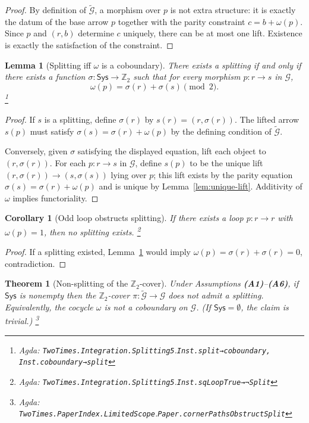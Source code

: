 \documentclass{article}
\newcommand{\Sys}{\mathsf{Sys}}
\newcommand{\Ztwo}{\mathbb{Z}_2}
\newcommand{\Agda}[1]{\texttt{#1}}
\newcommand{\AgdaRef}[2]{\emph{Agda: }\Agda{#1}.\Agda{#2}}
\newcommand{\AgdaNote}[2]{\footnote{\AgdaRef{#1}{#2}}}
\theoremstyle{definition}
\theoremstyle{plain}
\newtheorem{lemma}{Lemma}[section]
\newtheorem{theorem}{Theorem}[section]
\newtheorem{corollary}{Corollary}[section]
\begin{document}
\begin{proof}
By definition of $\widetilde{\mathcal G}$, a morphism over $p$ is not extra
structure: it is exactly the datum of the base arrow $p$ together with the
parity constraint $c=b+\omega(p)$. Since $p$ and $(r,b)$ determine $c$ uniquely,
there can be at most one lift. Existence is exactly the satisfaction of the
constraint.
\end{proof}

\begin{lemma}[Splitting iff $\omega$ is a coboundary]
\label{lem:split-cob}
There exists a splitting if and only if there exists a function
$\sigma:\Sys\to\Ztwo$ such that for every morphism $p:r\to s$ in $\mathcal G$,
\[\omega(p)=\sigma(r)+\sigma(s)\pmod 2.\]
\AgdaNote{TwoTimes.Integration.Splitting5}{Inst.split→coboundary, Inst.coboundary→split}
\end{lemma}

\begin{proof}
If $s$ is a splitting, define $\sigma(r)$ by $s(r)=(r,\sigma(r))$. The lifted arrow
$s(p)$ must satisfy $\sigma(s)=\sigma(r)+\omega(p)$ by the defining condition of
$\widetilde{\mathcal G}$.

Conversely, given $\sigma$ satisfying the displayed equation, lift each object to
$(r,\sigma(r))$. For each $p:r\to s$ in $\mathcal G$, define $s(p)$ to be the unique lift
$(r,\sigma(r))\to(s,\sigma(s))$ lying over $p$; this lift exists by the parity
equation $\sigma(s)=\sigma(r)+\omega(p)$ and is unique by Lemma~\ref{lem:unique-lift}.
Additivity of $\omega$ implies functoriality.
\end{proof}

\begin{corollary}[Odd loop obstructs splitting]
\label{cor:odd-loop}
If there exists a loop $p:r\to r$ with $\omega(p)=1$, then no splitting exists.
\AgdaNote{TwoTimes.Integration.Splitting5}{Inst.sqLoopTrue→¬Split}
\end{corollary}

\begin{proof}
If a splitting existed, Lemma~\ref{lem:split-cob} would imply
$\omega(p)=\sigma(r)+\sigma(r)=0$, contradiction.
\end{proof}

\begin{theorem}[Non-splitting of the $\Ztwo$-cover]
\label{thm:non-splitting}
Under Assumptions \textbf{(A1)}--\textbf{(A6)}, if $\Sys$ is nonempty then the $\Ztwo$-cover
$\pi:\widetilde{\mathcal G}\to\mathcal G$ does not admit a splitting.
Equivalently, the cocycle $\omega$ is not a coboundary on $\mathcal G$.
(If $\Sys=\emptyset$, the claim is trivial.)
\AgdaNote{TwoTimes.PaperIndex.LimitedScope}{Paper.cornerPathsObstructSplit}
\end{theorem}
\end{document}
